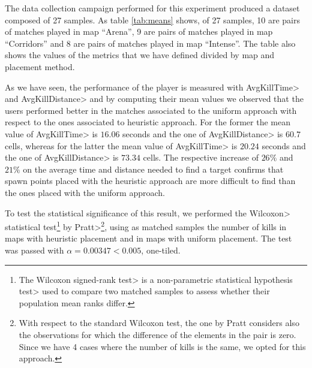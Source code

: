 The data collection campaign performed for this experiment produced a dataset composed of 27 samples. As table \ref{tab:means} shows, of 27 samples, 10 are pairs of matches played in map ``Arena'', 9 are pairs of matches played in map ``Corridors'' and 8 are pairs of matches played in map ``Intense''. The table also shows the values of the metrics that we have defined divided by map and placement method.

\par

As we have seen, the performance of the player is measured with \<AvgKillTime> and \<AvgKillDistance> and by computing their mean values we observed that the users performed better in the matches associated to the uniform approach with respect to the ones associated to heuristic approach. For the former the mean value of \<AvgKillTime> is $16.06$ seconds and the one of \<AvgKillDistance> is $60.7$ cells, whereas for the latter the mean value of \<AvgKillTime> is $20.24$ seconds and the one of \<AvgKillDistance> is $73.34$ cells. The respective increase of $26\%$ and $21\%$ on the average time and distance needed to find a target confirms that spawn points placed with the heuristic approach are more difficult to find than the ones placed with the uniform approach.

\par

To test the statistical significance of this result, we performed the \<Wilcoxon> statistical test\footnote{The \<Wilcoxon signed-rank test> is a \<non-parametric statistical hypothesis test> used to compare two matched samples to assess whether their population mean ranks differ.} by \<Pratt>\footnote{With respect to the standard Wilcoxon test, the one by Pratt considers also the observations for which the difference of the elements in the pair is zero. Since we have 4 cases where the number of kills is the same, we opted for this approach.}, using as matched samples the number of kills in maps with heuristic placement and in maps with uniform placement. The test was passed with $\alpha = 0.00347 < 0.005$, one-tiled.

